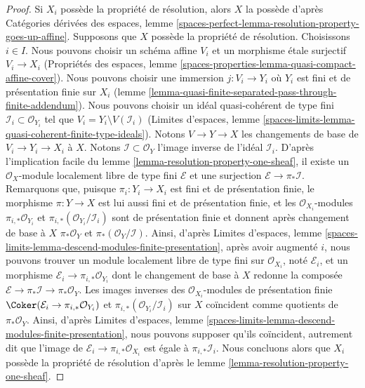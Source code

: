 \begin{proof}
Si $X_i$ possède la propriété de résolution, alors $X$ la possède d'après
Catégories dérivées des espaces, lemme
\ref{spaces-perfect-lemma-resolution-property-goes-up-affine}.
Supposons que $X$ possède la propriété de résolution.
Choisissons $i \in I$. Nous pouvons choisir un schéma affine $V_i$ et un morphisme
\'etale surjectif $V_i \to X_i$ 
(Propriétés des espaces, lemme
\ref{spaces-properties-lemma-quasi-compact-affine-cover}).
Nous pouvons choisir une immersion $j : V_i \to Y_i$
où $Y_i$ est fini et de présentation finie sur $X_i$
(lemme \ref{lemma-quasi-finite-separated-pass-through-finite-addendum}).
Nous pouvons choisir un idéal quasi-cohérent de type fini
$\mathcal{I}_i \subset \mathcal{O}_{Y_i}$
tel que $V_i = Y_i \setminus V(\mathcal{I}_i)$
(Limites d'espaces, lemme
\ref{spaces-limits-lemma-quasi-coherent-finite-type-ideals}).
Notons $V \to Y \to X$ les changements de base de $V_i \to Y_i \to X_i$
à $X$. Notons $\mathcal{I} \subset \mathcal{O}_Y$ l'image inverse
de l'idéal $\mathcal{I}_i$. D'après l'implication facile du
lemme \ref{lemma-resolution-property-one-sheaf},
il existe un $\mathcal{O}_X$-module localement libre de type fini
$\mathcal{E}$ et une surjection $\mathcal{E} \to \pi_*\mathcal{I}$.
Remarquons que, puisque $\pi_i : Y_i \to X_i$ est fini et de présentation finie,
le morphisme $\pi : Y \to X$ est lui aussi fini et de présentation finie,
et les $\mathcal{O}_{X_i}$-modules
$\pi_{i, *}\mathcal{O}_{Y_i}$ et
$\pi_{i, *}(\mathcal{O}_{Y_i}/\mathcal{I}_i)$
sont de présentation finie et donnent après changement de base à $X$
$\pi_*\mathcal{O}_Y$ et
$\pi_*(\mathcal{O}_Y/\mathcal{I})$. Ainsi, d'après Limites d'espaces, lemme
\ref{spaces-limits-lemma-descend-modules-finite-presentation},
après avoir augmenté $i$, nous pouvons trouver un module localement libre
de type fini sur $\mathcal{O}_{X_i}$, noté $\mathcal{E}_i$,
et un morphisme $\mathcal{E}_i \to \pi_{i, *}\mathcal{O}_{Y_i}$
dont le changement de base à $X$ redonne la composée
$\mathcal{E} \to \pi_*\mathcal{I} \to \pi_*\mathcal{O}_Y$.
Les images inverses des $\mathcal{O}_{X_i}$-modules de présentation finie
$\Coker(\mathcal{E}_i \to \pi_{i, *}\mathcal{O}_{Y_i})$
et $\pi_{i, *}(\mathcal{O}_{Y_i}/\mathcal{I}_i)$
sur $X$ coïncident comme quotients de $\pi_*\mathcal{O}_Y$.
Ainsi, d'après Limites d'espaces, lemme
\ref{spaces-limits-lemma-descend-modules-finite-presentation},
nous pouvons supposer qu'ils coïncident, autrement dit que
l'image de $\mathcal{E}_i \to \pi_{i, *}\mathcal{O}_{X_i}$
est égale à $\pi_{i, *}\mathcal{I}_i$.
Nous concluons alors que $X_i$ possède la propriété de résolution d'après le
lemme \ref{lemma-resolution-property-one-sheaf}.
\end{proof}

